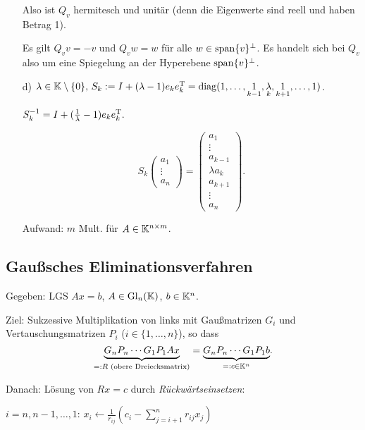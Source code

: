 \begin{Beispiele}[Elementarmatrizen]
\begin{itemize}
  Also ist $Q_v$ hermitesch und unitär (denn die Eigenwerte sind reell und
  haben Betrag 1).

  Es gilt $Q_v v = -v$ und $Q_v w = w$ für alle $w \in \operatorname*{\mathrm{span}}\{v\}^\perp$.
  Es handelt sich bei $Q_v$ also um eine Spiegelung an der Hyperebene
  $\operatorname*{\mathrm{span}}\{v\}^\perp$.

  \item[d)] \(
    \lambda \in \KK \setminus \{0\}$, $S_k := I + (\lambda - 1)e_ke_k^\T
      = \diag(1, \ldots, \underset{k-1}{1}, \underset{k}{\lambda}, \underset{k+1}{1}, \ldots, 1)
    \).

    $S_k^{-1} = I + (\frac{1}{\lambda} - 1) e_k e_k^\mathrm T.$

    \[
      S_k \begin{pmatrix} a_1 \\ \vdots \\ a_n \end{pmatrix}
        = \begin{pmatrix} a_1 \\ \vdots \\ a_{k-1} \\ \lambda a_k \\ a_{k+1} \\ \vdots \\ a_n \end{pmatrix}.
    \]

    Aufwand: $m$ Mult. für $A \in \mathbb K^{n\times m}$.
\end{itemize}
\end{Beispiele}

\subsection{Gaußsches Eliminationsverfahren}

Gegeben: LGS $Ax = b$, $A \in \mathrm{Gl}_n(\mathbb K)$, $b \in \mathbb K^n$.

Ziel: Sukzessive Multiplikation von links mit Gaußmatrizen $G_i$ und Vertauschungsmatrizen $P_i$ ($i \in \{1, \ldots, n\}$),
so dass \[
  \underset{=: R\text{ (obere Dreiecksmatrix)}}{\underbrace{
    G_nP_n \cdots G_1 P_1 A x}}
  = \underset{=: c \in \mathbb K^n}{\underbrace{
    G_nP_n \cdots G_1 P_1 b}}.
\]

Danach: Lösung von $Rx = c$ durch \emph{Rückwärtseinsetzen}:
\begin{codebox}
  \li \For $i = n, n-1, \ldots, 1$:
    \Do
      \li $x_i \gets \frac{1}{r_{ij}} \left( c_i - \sum_{j=i+1}^n r_{ij} x_j \right)$
    \End
\end{codebox}

